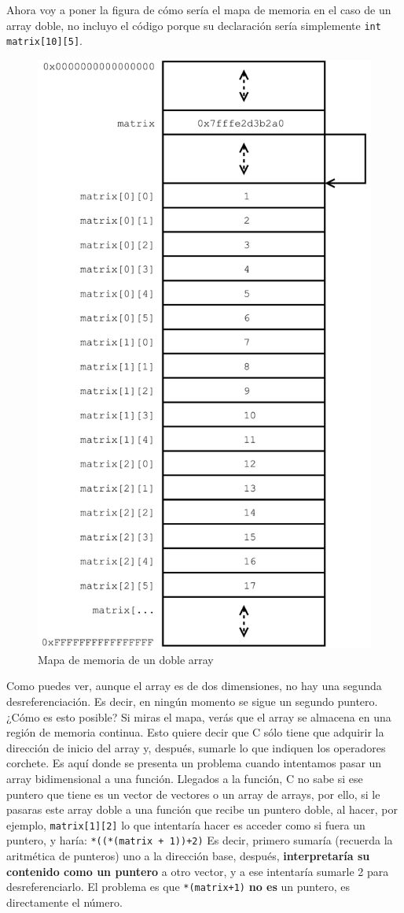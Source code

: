 \documentclass[a4paper]{article}
\begin{document}
Ahora voy a poner la figura de cómo sería el mapa de memoria en el caso de un
array doble, no incluyo el código porque su declaración sería simplemente
\lstinline[style=C]!int matrix[10][5]!.

\begin{figure}[H]
    \center
    \includegraphics[width=.5\linewidth]{double_array_map}
    \caption{Mapa de memoria de un doble array}
    \label{img:double_array_map}
\end{figure}

Como puedes ver, aunque el array es de dos dimensiones, no hay una segunda
desreferenciación. Es decir, en ningún momento se sigue un segundo puntero.
¿Cómo es esto posible? Si miras el mapa, verás que el array se almacena en
una región de memoria continua. Esto quiere decir que C sólo tiene que
adquirir la dirección de inicio del array y, después, sumarle lo que indiquen
los operadores corchete. Es aquí donde se presenta un problema cuando intentamos
pasar un array bidimensional a una función. Llegados a la función, C no sabe
si ese puntero que tiene es un vector de vectores o un array de arrays, por
ello, si le pasaras este array doble a una función que recibe un puntero doble,
al hacer, por ejemplo, \verb!matrix[1][2]! lo que intentaría hacer es acceder
como si fuera un puntero, y haría: \verb!*((*(matrix + 1))+2)! Es decir, primero
sumaría (recuerda la aritmética de punteros) uno a la dirección base, después,
\textbf{interpretaría su contenido como un puntero} a otro vector, y a ese
intentaría sumarle 2 para desreferenciarlo. El problema es que
\verb!*(matrix+1)! \textbf{no es} un puntero, es directamente el número.
\end{document}
